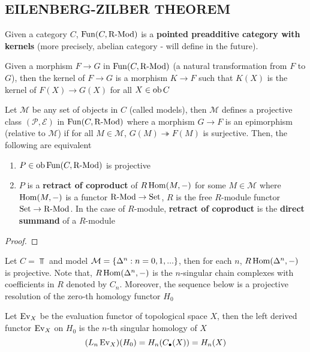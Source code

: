 \documentclass{article}
\begin{document}
\subsection{EILENBERG-ZILBER THEOREM}

\begin{remark}
    Given a category $C$, $\operatorname{Fun}(C, \operatorname{R-Mod})$ is a \textbf{pointed preadditive category with kernels} (more precisely, abelian category - will define in the future).

    Given a morphism $F \to G$ in $\operatorname{Fun}(C, \operatorname{R-Mod})$ (a natural transformation from $F$ to $G$), then the kernel of $F \to G$ is a morphism $K \to F$ such that $K(X)$ is the kernel of $F(X) \to G(X)$ for all $X \in \operatorname{ob} C$
\end{remark}

\begin{remark}
    Let $\mathcal{M}$ be any set of objects in $C$ (called models), then $\mathcal{M}$ defines a projective class $(\mathcal{P}, \mathcal{E})$ in $\operatorname{Fun}(C, \operatorname{R-Mod})$ where a morphism $G \to F$ is an epimorphism (relative to $\mathcal{M}$) if for all $M \in \mathcal{M}$, $G(M) \twoheadrightarrow F(M)$ is surjective. Then, the following are equivalent
    
    \begin{enumerate}
        \item $P \in \operatorname{ob} \operatorname{Fun}(C, \operatorname{R-Mod})$ is projective
        \item $P$ is a \textbf{retract of coproduct} of $R \operatorname{Hom}(M, -)$ for some $M \in \mathcal{M}$ where $\operatorname{Hom}(M, -)$ is a functor $\operatorname{R-Mod} \to \operatorname{Set}$, $R$ is the free $R$-module functor $\operatorname{Set} \to \operatorname{R-Mod}$. In the case of $R$-module, \textbf{retract of coproduct} is the \textbf{direct summand} of a $R$-module
    \end{enumerate}
\end{remark}

\begin{proof}
\end{proof}

\begin{remark}
    Let $C = \Top$ and model $\mathcal{M} = \{\Delta^n: n=0, 1, ...\}$, then for each $n$, $R \operatorname{Hom}(\Delta^n, -)$ is projective. Note that, $R \operatorname{Hom}(\Delta^n, -)$ is the $n$-singular chain complexes with coefficients in $R$ denoted by $C_n$. Moreover, the sequence below is a projective resolution of the zero-th homology functor $H_0$

    \begin{center}
    \end{center}

    Let $\operatorname{Ev}_X$ be the evaluation functor of topological space $X$, then the left derived functor $\operatorname{Ev}_X$ on $H_0$ is the $n$-th singular homology of $X$
    $$
        (L_n \operatorname{Ev}_X)(H_0) = H_n(C_\bullet(X)) = H_n(X)
    $$
\end{remark}
\end{document}
